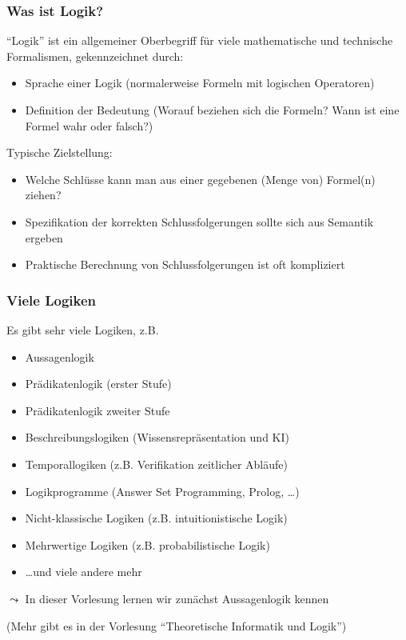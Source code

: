 \documentclass[aspectratio=1610,onlymath]{beamer}
\begin{document}
\begin{frame}\frametitle{Was ist Logik?}
\pause

"`Logik"' ist ein allgemeiner Oberbegriff für viele mathematische und technische Formalismen,
gekennzeichnet durch:
\begin{itemize}
\item {} Sprache einer Logik (normalerweise Formeln mit logischen Operatoren)
\item {} Definition der Bedeutung (Worauf beziehen sich die Formeln? Wann ist eine Formel wahr oder falsch?)
\end{itemize}\bigskip\pause

Typische Zielstellung: 
\begin{itemize}
\item Welche Schlüsse kann man aus einer gegebenen (Menge von) Formel(n) ziehen?
\item Spezifikation der korrekten Schlussfolgerungen sollte sich aus Semantik ergeben
\item Praktische Berechnung von Schlussfolgerungen ist oft kompliziert
\end{itemize}

\end{frame}

\begin{frame}\frametitle{Viele Logiken}

Es gibt sehr viele Logiken, z.B.
\begin{itemize}
\item Aussagenlogik
\item Prädikatenlogik (erster Stufe)
\item Prädikatenlogik zweiter Stufe
\item Beschreibungslogiken (Wissensrepräsentation und KI)
\item Temporallogiken (z.B. Verifikation zeitlicher Abläufe)
\item Logikprogramme (Answer Set Programming, Prolog, \ldots)
\item Nicht-klassische Logiken (z.B. intuitionistische Logik)
\item Mehrwertige Logiken (z.B. probabilistische Logik)
\item \ldots und viele andere mehr
\end{itemize}

$\leadsto$ In dieser Vorlesung lernen wir zunächst \alert{Aussagenlogik} kennen
\bigskip

(Mehr gibt es in der Vorlesung "`Theoretische Informatik und Logik"')

\end{frame}
\end{document}
